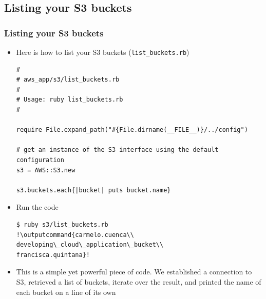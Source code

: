 \documentclass{beamer}
\newcommand{\outputcommand}[1]{\color{darkgreen}{#1}}
\begin{document}
\begin{frame}
\subsection{Listing your S3 buckets}
\frametitle{Listing your S3 buckets}
\begin{itemize}
\item Here is how to list your S3 buckets (\texttt{list\_buckets.rb})

\lstset{language=Ruby, style=eclipse}
\begin{lstlisting}[escapechar=!]
#
# aws_app/s3/list_buckets.rb
#
# Usage: ruby list_buckets.rb
#

require File.expand_path("#{File.dirname(__FILE__)}/../config")

# get an instance of the S3 interface using the default configuration
s3 = AWS::S3.new

s3.buckets.each{|bucket| puts bucket.name}
\end{lstlisting}

\item Run the code
\lstset{language=shell}
\begin{lstlisting}[escapechar=!]
$ ruby s3/list_buckets.rb
!\outputcommand{carmelo.cuenca\\
developing\_cloud\_application\_bucket\\
francisca.quintana}!
\end{lstlisting}

\item This is a simple yet powerful piece of code. We established a connection to S3, retrieved a list of buckets, iterate over the result, and printed the name of each bucket on a line of its own
\end{itemize}
\end{frame}
\end{document}
